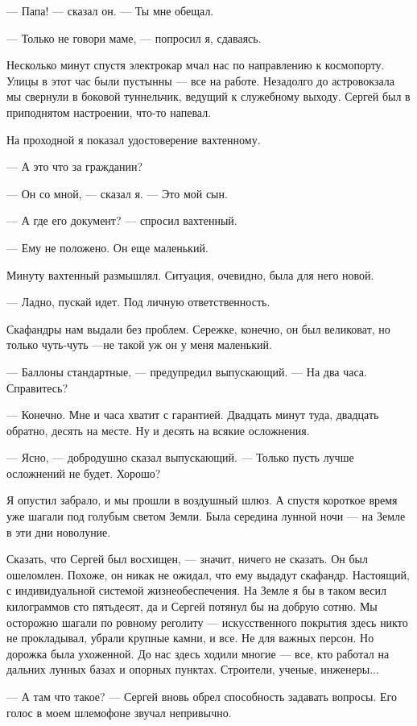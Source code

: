 \documentclass[11pt,a4paper,oneside]{article}
\begin{document}
— Папа! — сказал он. — Ты мне обещал.

— Только не говори маме, — попросил я, сдаваясь.

Несколько минут спустя электрокар мчал нас по направлению к космопорту. Улицы в этот час были пустынны — все на работе. Незадолго до астровокзала мы свернули в боковой туннельчик, ведущий к служебному выходу. Сергей был в приподнятом настроении, что-то напевал.

На проходной я показал удостоверение вахтенному.

— А это что за гражданин?

— Он со мной, — сказал я. — Это мой сын.

— А где его документ? — спросил вахтенный.

— Ему не положено. Он еще маленький.

Минуту вахтенный размышлял. Ситуация, очевидно, была для него новой.

— Ладно, пускай идет. Под личную ответственность.

Скафандры нам выдали без проблем. Сережке, конечно, он был великоват, но только чуть-чуть —не такой уж он у меня маленький.

— Баллоны стандартные, — предупредил выпускающий. — На два часа. Справитесь?

— Конечно. Мне и часа хватит с гарантией. Двадцать минут туда, двадцать обратно, десять на месте. Ну и десять на всякие осложнения.

— Ясно, — добродушно сказал выпускающий. — Только пусть лучше осложнений не будет. Хорошо?

Я опустил забрало, и мы прошли в воздушный шлюз. А спустя короткое время уже шагали под голубым светом Земли. Была середина лунной ночи — на Земле в эти дни новолуние.

Сказать, что Сергей был восхищен, — значит, ничего не сказать. Он был ошеломлен. Похоже, он никак не ожидал, что ему выдадут скафандр. Настоящий, с индивидуальной системой жизнеобеспечения. На Земле я бы в таком весил килограммов сто пятьдесят, да и Сергей потянул бы на добрую сотню. Мы осторожно шагали по ровному реголиту — искусственного покрытия здесь никто не прокладывал, убрали крупные камни, и все. Не для важных персон. Но дорожка была ухоженной. До нас здесь ходили многие — все, кто работал на дальних лунных базах и опорных пунктах. Строители, ученые, инженеры...

— А там что такое? — Сергей вновь обрел способность задавать вопросы. Его голос в моем шлемофоне звучал непривычно.
\end{document}
